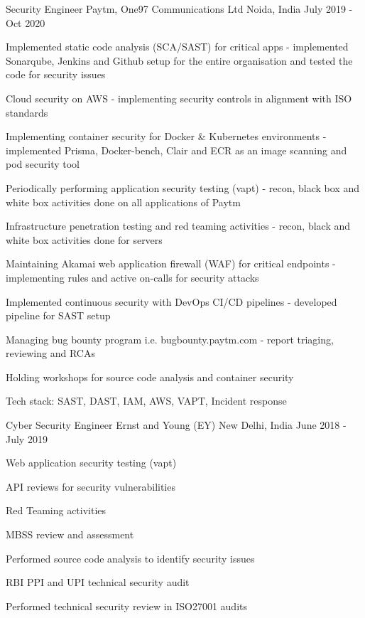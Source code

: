 \begin{cventries}
  \cventry
    {Security Engineer} %
    {Paytm, One97 Communications Ltd} %
    {Noida, India} %
    {July 2019 - Oct 2020} %
    {
      \begin{cvitems} %
        \item {Implemented static code analysis (SCA/SAST) for critical apps - implemented Sonarqube, Jenkins and Github setup for the entire organisation and tested the code for security issues}
        \item {Cloud security on AWS - implementing security controls in alignment with ISO standards}
        \item {Implementing container security for Docker \& Kubernetes environments - implemented Prisma, Docker-bench, Clair and ECR as an image scanning and pod security tool}
        \item {Periodically performing application security testing (vapt) - recon, black box and white box activities done on all applications of Paytm}
        \item {Infrastructure penetration testing and red teaming activities - recon, black and white box activities done for servers}
        \item {Maintaining Akamai web application firewall (WAF) for critical endpoints - implementing rules and active on-calls for security attacks}
        \item {Implemented continuous security with DevOps CI/CD pipelines - developed pipeline for SAST setup}
        \item {Managing bug bounty program i.e. bugbounty.paytm.com - report triaging, reviewing and RCAs}
        \item {Holding workshops for source code analysis and container security}
        \item {Tech stack: SAST, DAST, IAM, AWS, VAPT, Incident response}
      \end{cvitems}
    }

  \cventry
    {Cyber Security Engineer} %
    {Ernst and Young (EY)} %
    {New Delhi, India} %
    {June 2018 - July 2019} %
    {
      \begin{cvitems} %
        \item {Web application security testing (vapt)}
        \item {API reviews for security vulnerabilities}
        \item {Red Teaming activities}
        \item {MBSS review and assessment}
        \item {Performed source code analysis to identify security issues}
        \item {RBI PPI and UPI technical security audit}
        \item {Performed technical security review in ISO27001 audits}
      \end{cvitems}
    }

\end{cventries}
